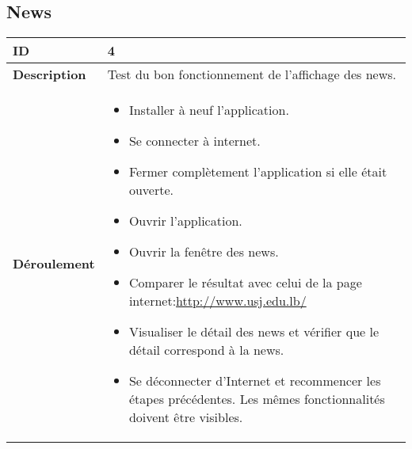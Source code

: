 		\subsection{News}
					 \begin{longtable}{m{4cm}|p{10cm}|}
					 \textbf{ ID} & 4 \\
					 \hline \textbf{Description} & Test du bon fonctionnement de l'affichage des news.\\
					 \hline \textbf{Déroulement} &
						 \begin{itemize}
						  	\item Installer à neuf l'application.
						  	\item Se connecter à internet.
							 \item Fermer complètement l'application si elle était ouverte.
							 \item Ouvrir l'application.
							 \item Ouvrir la fenêtre des news.
							 \item Comparer le résultat avec celui de la page internet:\url{http://www.usj.edu.lb/}
							 \item Visualiser le détail des news et vérifier que le détail correspond à la news.
							\item Se déconnecter d'Internet et recommencer les étapes précédentes. Les mêmes fonctionnalités doivent être visibles.
						 \end{itemize}
					 \\
				 \end{longtable} 

